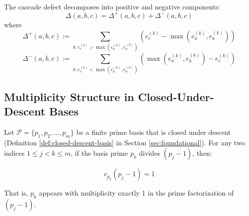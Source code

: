 \begin{definition}
\label{def:signed-defect}
The cascade defect decomposes into positive and negative components:
\begin{equation}
\Delta(a,b,c) = \Delta^{+}(a,b,c) + \Delta^{-}(a,b,c)
\end{equation}
where
\begin{equation}
\Delta^{+}(a,b,c) := \sum_{k: e_c^{(k)} > \max(e_a^{(k)}, e_b^{(k)})} \left(e_c^{(k)} - \max(e_a^{(k)}, e_b^{(k)})\right)
\end{equation}
\begin{equation}
\Delta^{-}(a,b,c) := \sum_{k: e_c^{(k)} < \max(e_a^{(k)}, e_b^{(k)})} \left(\max(e_a^{(k)}, e_b^{(k)}) - e_c^{(k)}\right)
\end{equation}
\end{definition}

\subsection{Multiplicity Structure in Closed-Under-Descent Bases}
\label{subsec:multiplicity-one}

\begin{lemma}
\label{lem:closed-descent-multiplicity-one}

Let $\mathcal{P} = \{p_1, p_2, \ldots, p_m\}$ be a finite prime basis that is closed under descent (Definition \ref{def:closed-descent-basis} in Section \ref{sec:foundational}). For any two indices $1 \leq j < k \leq m$, if the basis prime $p_k$ divides $(p_j - 1)$, then:

\begin{equation}
v_{p_k}(p_j - 1) = 1
\end{equation}

That is, $p_k$ appears with multiplicity exactly 1 in the prime factorization of $(p_j - 1)$.

\end{lemma}

